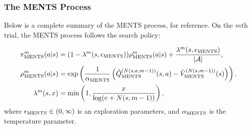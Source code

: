     

    
    
    
    \subsubsection{The MENTS Process}
    
    Below is a complete summary of the MENTS process, for reference. On the $m$th trial, the MENTS process follows the search policy:


    \begin{align}
        {\pi^{m}_{{\textnormal{MENTS}}}}(a|s) &= (1-{\lambda^{m}(s,{\epsilon_{{\textnormal{MENTS}}}})}){\rho^{m}_{{\textnormal{MENTS}}}}(a|s) + \frac{{\lambda^{m}(s,{\epsilon_{{\textnormal{MENTS}}}})}}{|\mathcal{A}|}, 
                    \label{appeq:ments_soft_policy} \\ 
        {\rho^{m}_{{\textnormal{MENTS}}}}(a|s) &= \exp\left(
            \frac{1}{{\alpha_{{\textnormal{MENTS}}}}}\left({\hat{Q}^{(N(s,a,m-1))}_{{\textnormal{MENTS}}}}(s,a)-{\hat{V}^{(N(s,m-1))}_{{\textnormal{MENTS}}}}(s)\right)\right). \\
        \lambda^m(s,x) &= \min\left(1, \frac{x}{\log(e+N(s,m-1))}\right),
    \end{align}
    where ${\epsilon_{{\textnormal{MENTS}}}}\in(0,\infty)$ is an exploration parameters, and ${\alpha_{{\textnormal{MENTS}}}}$ is the temperature parameter. 

